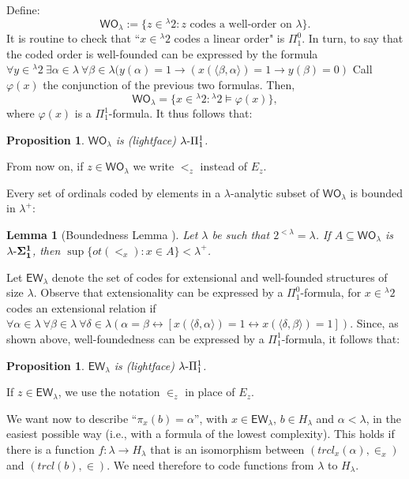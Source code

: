 \documentclass{amsart}
\numberwithin{equation}{section}
\def\hyp{{\hbox{-}}}
\newtheorem{lemma}[theorem]{Lemma}
\newtheorem{proposition}[theorem]{Proposition}
\theoremstyle{definition}
\theoremstyle{remark}
\begin{document}
Define:
        \[
            \mathsf{WO}_{\lambda}:=\{z\in{}^{\lambda}2:z\text{ codes a well-order on $\lambda$}\}.
        \]
    It is routine to check that ``$x\in{}^{\lambda}2$ codes a linear order" is $\Pi^0_1$. In turn, to say that the coded order is well-founded can be expressed by the formula $\forall y\in{}^{\lambda}2\ \exists\alpha\in\lambda\ \forall\beta\in\lambda(y(\alpha)=1\rightarrow(x(\langle\beta,\alpha\rangle)=1\rightarrow y(\beta)=0)$
Call $\varphi(x)$ the conjunction of the previous two formulas. Then, 
\[
\mathsf{WO}_\lambda=\{x\in {}^\lambda 2:{}^\lambda 2\vDash \varphi(x)\},
\]
where $\varphi(x)$ is a $\Pi^1_1$-formula. It thus follows that:
\begin{proposition}\label{WO_is_lightface_pi_1_1} $\mathsf{WO}_{\lambda}$ is \emph{(lightface)} $\lambda\hyp\Pi^1_1$. 
\end{proposition}

From now on, if $z\in \mathsf{WO}_{\lambda}$ we write $<_{z}$ instead of $E_{z}$. 

Every set of ordinals coded by elements in a $\lambda$-analytic subset of $\mathsf{WO}_{\lambda}$ is bounded in $\lambda^{+}$:

\begin{lemma}[Boundedness Lemma {\cite[Theorem 6.2.3]{DMR}}]\label{lemma:boundedness-lemma} Let $\lambda$ be such that $2^{<\lambda}=\lambda$. If $A\subseteq \mathsf{WO}_{\lambda}$ is $\lambda\hyp\boldsymbol{\Sigma^1_1}$, then $\sup\{ot(<_{x}):x\in A\}<\lambda^{+}$.
\end{lemma}

Let $\mathsf{EW}_{\lambda}$ denote the set of codes for extensional and well-founded structures of size $\lambda$. Observe that extensionality can be expressed by a $\Pi^0_1$-formula, for  $x\in{}^{\lambda}2$ codes an extensional relation if 
$\forall\alpha\in\lambda\ \forall\beta\in\lambda\ \forall\delta\in\lambda(\alpha=\beta\leftrightarrow[x(\langle\delta,\alpha\rangle)=1\leftrightarrow x(\langle\delta,\beta\rangle)=1])$. Since, as shown above, well-foundedness can be expressed by a $\Pi^1_1$-formula, it follows that:

\begin{proposition}\label{EW_is_lightface_pi_1_1}
	$\mathsf{EW}_{\lambda}$ is \emph{(lightface)} $\lambda\hyp\Pi^1_1$.
\end{proposition}

If $z \in \mathsf{EW}_\lambda$, we use the notation $\in_z$ in place of $E_z$.

We want now to describe ``$\pi_x(b)=\alpha$'', with $x \in \mathsf{EW}_\lambda$, $b\in H_\lambda$ and $\alpha<\lambda$, in the easiest possible way (i.e., with a formula of the lowest complexity). This holds if there is a function $f:\lambda\to H_\lambda$ that is an isomorphism between $(trcl_x(\alpha),\in_x)$ and $(trcl(b),\in)$. We need therefore to code functions from $\lambda$ to $H_\lambda$.
\end{document}
